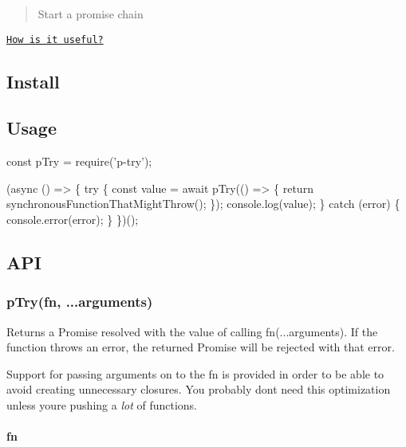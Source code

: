 \begin{quote}
Start a promise chain \end{quote}


\href{http://cryto.net/~joepie91/blog/2016/05/11/what-is-promise-try-and-why-does-it-matter/}{\tt How is it useful?}

\subsection*{Install}




\subsection*{Usage}


\begin{DoxyCode}
const pTry = require('p-try');

(async () => \{
    try \{
        const value = await pTry(() => \{
            return synchronousFunctionThatMightThrow();
        \});
        console.log(value);
    \} catch (error) \{
        console.error(error);
    \}
\})();
\end{DoxyCode}


\subsection*{A\+PI}

\subsubsection*{p\+Try(fn, ...arguments)}

Returns a {\ttfamily Promise} resolved with the value of calling {\ttfamily fn(...arguments)}. If the function throws an error, the returned {\ttfamily Promise} will be rejected with that error.

Support for passing arguments on to the {\ttfamily fn} is provided in order to be able to avoid creating unnecessary closures. You probably don\textquotesingle{}t need this optimization unless you\textquotesingle{}re pushing a {\itshape lot} of functions.

\paragraph*{fn}

